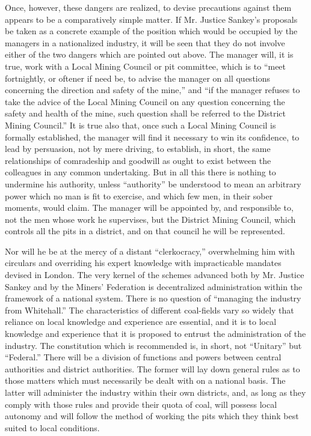 \documentclass{book}
\begin{document}
Once, however, these dangers are realized, to devise precautions against them appears to be a comparatively simple matter. If Mr. Justice Sankey’s proposals be taken as a concrete example of the position which would be occupied by the managers in a nationalized industry, it will be seen that they do not involve either of the two dangers which are pointed out above. The manager will, it is true, work with a Local Mining Council or pit committee, which is to “meet fortnightly, or oftener if need be, to advise the manager on all questions concerning the direction and safety of the mine,” and “if the manager refuses to take the advice of the Local Mining Council on any question concerning the safety and health of the mine, such question shall be referred to the District Mining Council.” It is true also that, once such a Local Mining Council is formally established, the manager will find it necessary to win its confidence, to lead by persuasion, not by mere driving, to establish, in short, the same relationships of comradeship and goodwill as ought to exist between the colleagues in any common undertaking. But in all this there is nothing to undermine his authority, unless “authority” be understood to mean an arbitrary power which no man is fit to exercise, and which few men, in their sober moments, would claim. The manager will be appointed by, and responsible to, not the men whose work he supervises, but the District Mining Council, which controls all the pits in a district, and on that council he will be represented.

Nor will he be at the mercy of a distant “clerkocracy,” overwhelming him with circulars and overriding his expert knowledge with impracticable mandates devised in London. The very kernel of the schemes advanced both by Mr. Justice Sankey and by the Miners’ Federation is decentralized administration within the framework of a national system. There is no question of “managing the industry from Whitehall.” The characteristics of different coal-fields vary so widely that reliance on local knowledge and experience are essential, and it is to local knowledge and experience that it is proposed to entrust the administration of the industry. The constitution which is recommended is, in short, not “Unitary” but “Federal.” There will be a division of functions and powers between central authorities and district authorities. The former will lay down general rules as to those matters which must necessarily be dealt with on a national basis. The latter will administer the industry within their own districts, and, as long as they comply with those rules and provide their quota of coal, will possess local autonomy and will follow the method of working the pits which they think best suited to local conditions.
\end{document}
